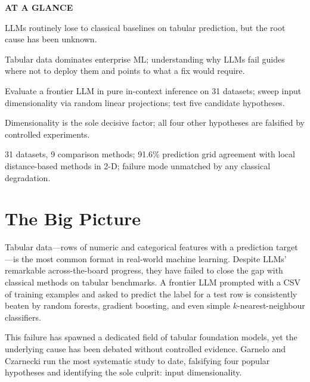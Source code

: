 \documentclass[10pt,twocolumn]{article}
\begin{document}
\begin{mdframed}[backgroundcolor=boxgray,linecolor=rulered,linewidth=1pt,
    innerleftmargin=6pt,innerrightmargin=6pt,
    innertopmargin=6pt,innerbottommargin=6pt]
\textbf{\small AT A GLANCE}\par\vspace{4pt}
\begin{description}[leftmargin=0pt,labelsep=4pt,itemsep=2pt,parsep=0pt,
    font=\small\bfseries]
  \item[Problem:] LLMs routinely lose to classical baselines on tabular
    prediction, but the root cause has been unknown.
  \item[Why it matters:] Tabular data dominates enterprise ML; understanding why
    LLMs fail guides where not to deploy them and points to what a fix would require.
  \item[Method:] Evaluate a frontier LLM in pure in-context inference on 31 datasets;
    sweep input dimensionality via random linear projections; test five candidate hypotheses.
  \item[Result:] Dimensionality is the sole decisive factor; all four other hypotheses
    are falsified by controlled experiments.
  \item[Evidence:] 31 datasets, 9 comparison methods; 91.6\% prediction grid agreement
    with local distance-based methods in 2-D; failure mode unmatched by any classical degradation.
\end{description}
\end{mdframed}

\section{The Big Picture}

Tabular data---rows of numeric and categorical features with a prediction target---is
the most common format in real-world machine learning. Despite LLMs' remarkable
across-the-board progress, they have failed to close the gap with classical methods
on tabular benchmarks. A frontier LLM prompted with a CSV of training examples and
asked to predict the label for a test row is consistently beaten by random forests,
gradient boosting, and even simple $k$-nearest-neighbour classifiers.

This failure has spawned a dedicated field of tabular foundation models, yet the
underlying cause has been debated without controlled evidence. Garnelo and Czarnecki
run the most systematic study to date, falsifying four popular hypotheses and
identifying the sole culprit: input dimensionality.
\end{document}
